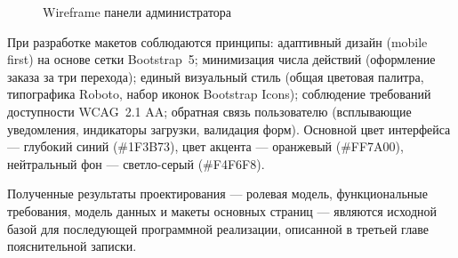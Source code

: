 \begin{figure}[ht!]
\caption{Wireframe панели администратора}
\label{fig:wf-admin}
\end{figure}

При разработке макетов соблюдаются принципы: адаптивный дизайн (mobile first) на основе сетки Bootstrap~5; минимизация числа действий (оформление заказа за три перехода); единый визуальный стиль (общая цветовая палитра, типографика Roboto, набор иконок Bootstrap Icons); соблюдение требований доступности WCAG~2.1 AA; обратная связь пользователю (всплывающие уведомления, индикаторы загрузки, валидация форм). Основной цвет интерфейса --- глубокий синий (\#1F3B73), цвет акцента --- оранжевый (\#FF7A00), нейтральный фон --- светло-серый (\#F4F6F8).

Полученные результаты проектирования --- ролевая модель, функциональные требования, модель данных и макеты основных страниц --- являются исходной базой для последующей программной реализации, описанной в третьей главе пояснительной записки.
